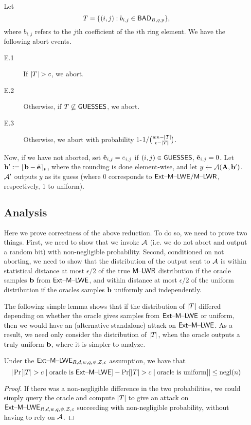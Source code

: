 Let \[T=\{(i,j) : b_{i,j} \in \textsf{BAD}_{B,q,p}\},\] where
$b_{i,j}$ refers to the $j$th coefficient of the $i$th ring element.
We have the following abort events.
\begin{description}
\item[E.1] If $\lvert T\rvert > c$, we abort.
\item[E.2] Otherwise, if $T \not \subseteq \textsf{GUESSES}$, we abort.
\item[E.3] Otherwise, we abort with
probability 1-$1/\binom{wn-\lvert T\rvert}{c-\lvert T\rvert}$.  
\end{description}
Now, if we have not aborted, set $\tilde{\mathbf{e}}_{i,j}=e_{i,j}$ if $(i,j) \in
\textsf{GUESSES}$, $\tilde{\mathbf{e}}_{i,j}=0$.  Let $\mathbf{b}' :=
\lfloor\mathbf{b} - \tilde{\mathbf{e}}\rceil_p$, where the rounding is done
element-wise, and let $y \gets \mathcal{A}(\mathbf{A}, \mathbf{b}')$. $\mathcal{A}'$ outputs
$y$ as its guess (where 0 corresponds to $\mathsf{Ext \text{\textendash} M \text{\textendash} LWE}/\mathsf{M \text{\textendash} LWR}$,
respectively, 1 to uniform).



\subsection{Analysis}
\label{sec:analysis}

Here we prove correctness of the above reduction. To do so, we need to
prove two things. First, we need to show that we invoke $\mathcal{A}$
(i.e. we do not abort and output a random bit) with non-negligible
probability. Second, conditioned on not aborting, we need to show that
the distribution of the output sent to $\mathcal{A}$ is within statistical
distance at most $\epsilon/2$ of the true $\mathsf{M \text{\textendash} LWR}$ distribution if the
oracle samples $\mathbf{b}$ from $\mathsf{Ext \text{\textendash} M \text{\textendash} LWE}$, and within distance at most
$\epsilon/2$ of the uniform distribution if the oracles samples
$\mathbf{b}$ uniformly and independently.

The following simple lemma shows that if the distribution of $\lvert T\rvert$
differed depending on whether the oracle gives samples from $\mathsf{Ext \text{\textendash} M \text{\textendash} LWE}$
or uniform, then we would have an (alternative standalone) attack on
$\mathsf{Ext \text{\textendash} M \text{\textendash} LWE}$. As a result, we need only consider the distribution of
$\lvert T\rvert$, when the oracle outputs a truly uniform $\mathbf{b}$, where it
is simpler to analyze.
\begin{lemma}\label{lem:t_ind} Under the $\mathsf{Ext \text{\textendash} M \text{\textendash} LWE}_{R,d,w,q,\psi,\mathcal{Z},c}$ assumption,
  we have that 
\[\lvert\Pr[\lvert T\rvert > c \mid \text{oracle is \ensuremath{\mathsf{Ext \text{\textendash} M \text{\textendash} LWE}}}] - \Pr[\lvert T\rvert
    > c \mid \text{oracle is uniform}]\rvert \leq \operatorname{negl}(n)\]
\end{lemma}
\begin{proof}
  If there was a non-negligible difference in the two probabilities,
  we could simply query the oracle and compute $\lvert T\rvert$ to give an
  attack on $\mathsf{Ext \text{\textendash} M \text{\textendash} LWE}_{R,d,w,q,\psi,\mathcal{Z},c}$ succeeding with non-negligible
  probability, without having to rely on $\mathcal{A}$.\end{proof}


